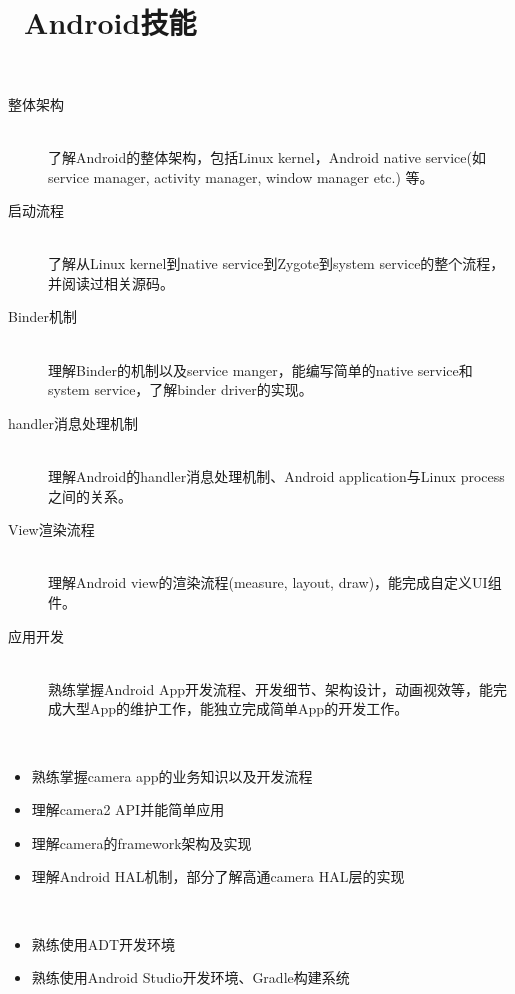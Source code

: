 \documentclass{resume}
\begin{document}
\section{\faCogs\ Android技能}
\begin{description}[parsep=0.5ex]
  \item[Android系统] \ 
    \begin{description}
         \item[整体架构] \ \\ 了解Android的整体架构，包括Linux kernel，Android native service(如service manager, activity manager, window manager etc.) 等。
         \item[启动流程] \ \\ 了解从Linux kernel到native service到Zygote到system service的整个流程，并阅读过相关源码。
         \item[Binder机制] \ \\ 理解Binder的机制以及service manger，能编写简单的native service和system service，了解binder driver的实现。
         \item[handler消息处理机制] \ \\ 理解Android的handler消息处理机制、Android application与Linux process之间的关系。
         \item[View渲染流程] \ \\ 理解Android view的渲染流程(measure, layout, draw)，能完成自定义UI组件。
         \item[应用开发] \ \\ 熟练掌握Android App开发流程、开发细节、架构设计，动画视效等，能完成大型App的维护工作，能独立完成简单App的开发工作。
    \end{description}
  \item[Camera软件技术栈] \ 
    \begin{itemize}
       \item 熟练掌握camera app的业务知识以及开发流程
       \item 理解camera2 API并能简单应用
       \item 理解camera的framework架构及实现
       \item 理解Android HAL机制，部分了解高通camera HAL层的实现
    \end{itemize}
  \item[开发工具] \ 
    \begin{itemize}
        \item 熟练使用ADT开发环境
        \item 熟练使用Android Studio开发环境、Gradle构建系统
    \end{itemize}
\end{description}
\end{document}
